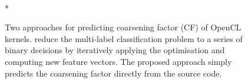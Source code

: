 \begin{figure}
  \centering %
  \\*%
  \caption[Predicting OpenCL thread coarsening factors.]{%
      Two approaches for predicting coarsening factor (CF) of OpenCL kernels.
      \citeauthor{Magni2014} reduce the multi-label classification problem to a
      series of binary decisions by iteratively applying the optimisation and
      computing new feature vectors. The proposed approach simply predicts the coarsening factor directly from the source code.%
  }
  \label{fig:cascading-nn}
\end{figure}


